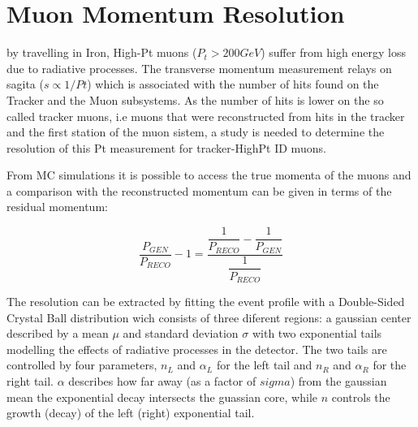 \section{Muon Momentum Resolution}

by travelling in Iron, High-Pt muons ($P_{t}>200GeV$) suffer from high energy
loss due to radiative processes. The transverse momentum measurement relays on
sagita ($s \propto 1/Pt$) which is associated with the number of hits found on
the Tracker and the Muon subsystems. As the number of hits is lower on the so called
tracker muons, i.e muons that were reconstructed from hits in the tracker and the
first station of the muon sistem, a study is needed to determine
the resolution of this Pt measurement for tracker-HighPt ID muons.

From MC simulations it is possible to access the true momenta of the muons and
a comparison with the reconstructed momentum can be given in terms of the
residual momentum:

\begin{equation}
  \frac{P_{GEN}}{P_{RECO}} - 1 = \frac{\dfrac{1}{P_{RECO}}-\dfrac{1}{P_{GEN}}}{\dfrac{1}{P_{RECO}}}
\end{equation}

The resolution can be extracted by fitting the event profile with a
Double-Sided Crystal Ball distribution wich consists of three diferent regions:
a gaussian center described by a mean $\mu$ and standard deviation $\sigma$ with two
exponential tails modelling the effects of radiative processes in the detector.
The two tails are controlled by four parameters, $n_L$ and $\alpha_L$ for the
left tail and $n_R$ and $\alpha_R$ for the right tail. $\alpha$ describes how
far away (as a factor of $sigma$) from the gaussian mean the exponential decay
intersects the guassian core, while $n$ controls the growth (decay) of the
left (right) exponential tail.


